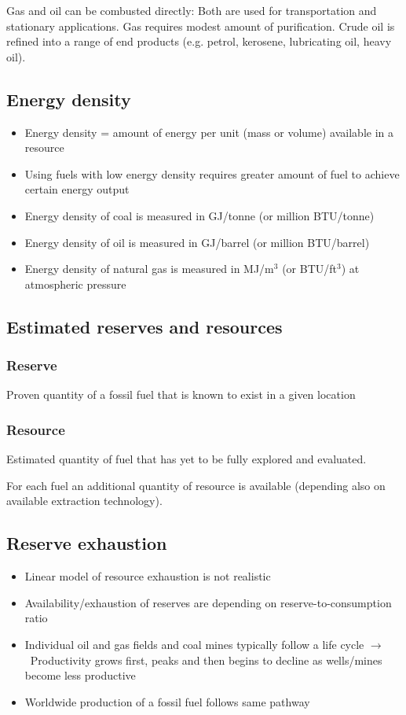 \documentclass{article}
\begin{document}
Gas and oil can be combusted directly:
Both are used for transportation and stationary applications.
Gas requires modest amount of purification.
Crude oil is refined into a range of end products
(e.g. petrol, kerosene, lubricating oil, heavy oil).

\subsection{Energy density}
\begin{itemize}
    \item Energy density = amount of energy per unit (mass or volume) available in a resource
    \item Using fuels with low energy density requires greater amount of fuel to achieve certain energy output
    \item Energy density of coal is measured in GJ/tonne (or million BTU/tonne)
    \item Energy density of oil is measured in GJ/barrel (or million BTU/barrel)
    \item Energy density of natural gas is measured in MJ/m$^3$ (or BTU/ft$^3$) at atmospheric pressure
\end{itemize}

\subsection{Estimated reserves and resources}
\subsubsection{\color{red}Reserve}
Proven quantity of a fossil fuel that is known to exist in a given location



\subsubsection{\color{red}Resource}
Estimated quantity of fuel that has yet to be fully explored and evaluated.

For each fuel an additional quantity of resource is available
(depending also on available extraction technology).

\subsection{Reserve exhaustion}
\begin{itemize}
    \item Linear model of resource exhaustion is not realistic
    \item Availability/exhaustion of reserves are depending on reserve-to-consumption ratio
    \item Individual oil and gas fields and coal mines typically follow a life cycle $\to$\ Productivity grows first, peaks and then begins to decline as wells/mines become less productive
    \item Worldwide production of a fossil fuel follows same pathway
\end{itemize}
\end{document}
